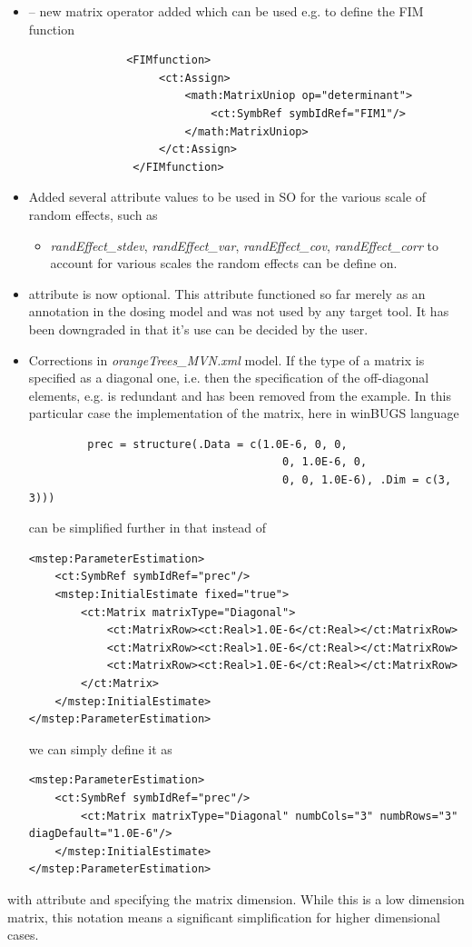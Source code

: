 \begin{itemize}
\item
{} -- new matrix operator added which can be used e.g. 
to define the FIM function
\lstset{language=XML}
\begin{lstlisting}
               <FIMfunction>
                    <ct:Assign>
                        <math:MatrixUniop op="determinant">
                            <ct:SymbRef symbIdRef="FIM1"/>
                        </math:MatrixUniop>
                    </ct:Assign>
                </FIMfunction>
\end{lstlisting}
\item
Added several  attribute values to be used in SO for
the various scale of random effects, such as
\begin{itemize}
\item
\emph{randEffect\_stdev}, \emph{randEffect\_var}, \emph{randEffect\_cov}, 
\emph{randEffect\_corr} to account for various scales the random effects 
can be define on. 
\end{itemize}
\item
{} attribute is now optional. This attribute functioned so far 
merely as an annotation in the dosing model and was not used by any target tool. 
It has been downgraded in that it's use can be decided by the user.
\item
Corrections in \emph{orangeTrees\_MVN.xml} model. If the type of a
matrix is specified as a diagonal one, i.e.  then the 
specification of the off-diagonal elements, e.g. 
is redundant and has been removed from the example. 
In this particular case the implementation of the matrix, here in winBUGS language
\lstset{language=MLX}
\begin{lstlisting}
         prec = structure(.Data = c(1.0E-6, 0, 0,
                                       0, 1.0E-6, 0,
                                       0, 0, 1.0E-6), .Dim = c(3, 3)))
\end{lstlisting}
can be simplified further in that instead of 
\lstset{language=XML}
\begin{lstlisting}
<mstep:ParameterEstimation>
    <ct:SymbRef symbIdRef="prec"/>
    <mstep:InitialEstimate fixed="true">
        <ct:Matrix matrixType="Diagonal">
            <ct:MatrixRow><ct:Real>1.0E-6</ct:Real></ct:MatrixRow>
            <ct:MatrixRow><ct:Real>1.0E-6</ct:Real></ct:MatrixRow>
            <ct:MatrixRow><ct:Real>1.0E-6</ct:Real></ct:MatrixRow>
        </ct:Matrix>
    </mstep:InitialEstimate>
</mstep:ParameterEstimation>
\end{lstlisting}
we can simply define it as
\lstset{language=XML}
\begin{lstlisting}
<mstep:ParameterEstimation>
    <ct:SymbRef symbIdRef="prec"/>
        <ct:Matrix matrixType="Diagonal" numbCols="3" numbRows="3" diagDefault="1.0E-6"/> 
    </mstep:InitialEstimate>
</mstep:ParameterEstimation>
\end{lstlisting}
\end{itemize}
with attribute  and  specifying the matrix dimension.
While this is a low dimension matrix, this notation means a significant simplification
for higher dimensional cases.













